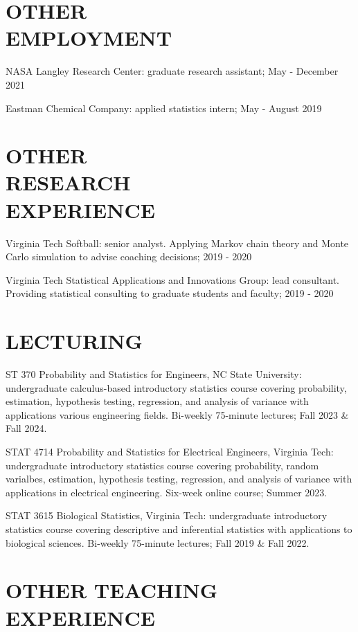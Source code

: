 \documentclass[margin,line,11pt]{res}
\begin{document}
\begin{resume}
\medskip
\section{OTHER \\ EMPLOYMENT}

{\sc NASA Langley Research Center}: graduate research assistant; May - December 2021

{\sc Eastman Chemical Company}: applied statistics intern; May - August 2019

\medskip
\section{OTHER \\ RESEARCH \\EXPERIENCE}

{\sc Virginia Tech Softball}: senior analyst.  Applying Markov chain theory and Monte Carlo simulation to advise coaching decisions; 2019 - 2020

{\sc Virginia Tech Statistical Applications and Innovations Group}: lead consultant.  Providing statistical consulting to graduate students and faculty; 2019 - 2020


\medskip
\section{LECTURING}

{\sc ST 370 Probability and Statistics for Engineers, NC State University}: undergraduate calculus-based introductory statistics course covering probability, estimation, hypothesis testing, regression, and analysis of variance with applications various engineering fields. Bi-weekly 75-minute lectures; Fall 2023 \& Fall 2024.

{\sc STAT 4714 Probability and Statistics for Electrical Engineers, Virginia Tech}: undergraduate introductory statistics course covering probability, random varialbes, estimation, hypothesis testing, regression, and analysis of variance with applications in electrical engineering. Six-week online course; Summer 2023.

{\sc STAT 3615 Biological Statistics, Virginia Tech}: undergraduate introductory statistics course covering descriptive and inferential statistics with applications to biological sciences. Bi-weekly 75-minute lectures; Fall 2019 \& Fall 2022.



\medskip
\section{OTHER TEACHING EXPERIENCE}


\end{resume}
\end{document}
